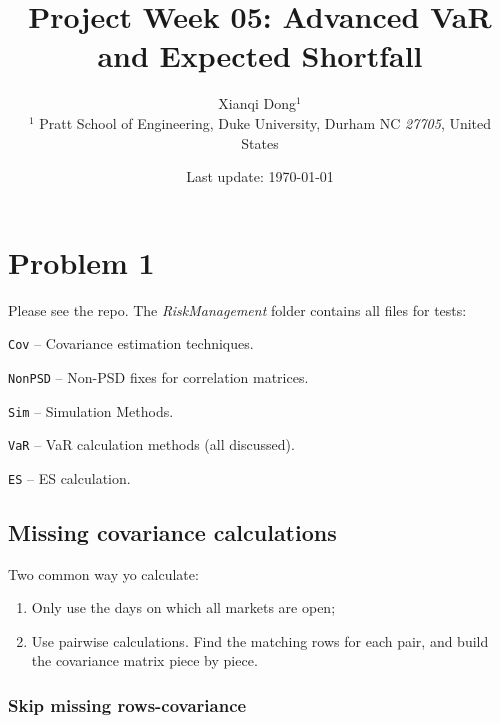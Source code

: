 \documentclass{gji}
\title[Project Week 05: Advanced VaR and Expected Shortfall]
  {Project Week 05: 
  Advanced VaR and Expected Shortfall}
\author[Xianqi Dong]
  {Xianqi Dong$^1$ \\
  $^1$ Pratt School of Engineering, Duke University, 
  Durham NC \emph{27705}, United States
  }
\date{Last update: \today}
\begin{document}
\label{firstpage}

\maketitle

\section{Problem 1}

Please see the repo. The \textit{RiskManagement} folder contains all files for tests:
\begin{description}
  \item \texttt{Cov} -- Covariance estimation techniques.
  \item \texttt{NonPSD} -- Non-PSD fixes for correlation matrices.
  \item \texttt{Sim} -- Simulation Methods.
  \item \texttt{VaR} -- VaR calculation methods (all discussed).
  \item \texttt{ES} -- ES calculation.
\end{description}

\subsection{Missing covariance calculations}
Two common way yo calculate:
\begin{enumerate}
  \item Only use the days on which all markets are open;
  \item Use pairwise calculations. Find the matching rows for each pair, 
        and build the covariance matrix piece by piece.
\end{enumerate}

\subsubsection{Skip missing rows-covariance}
\end{document}
